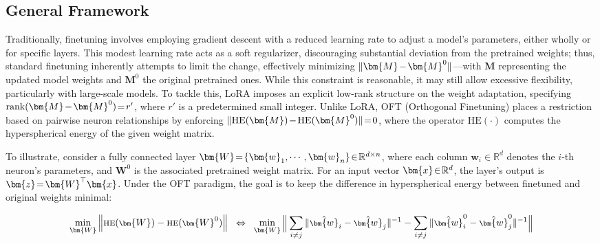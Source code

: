 \subsection{General Framework}

Traditionally, finetuning involves employing gradient descent with a reduced learning rate to adjust a model's parameters, either wholly or for specific layers. This modest learning rate acts as a soft regularizer, discouraging substantial deviation from the pretrained weights; thus, standard finetuning inherently attempts to limit the change, effectively minimizing $\thickmuskip=2mu \medmuskip=2mu \| \bm{M} - \bm{M}^0\|$—with $\bm{M}$ representing the updated model weights and $\bm{M}^0$ the original pretrained ones. While this constraint is reasonable, it may still allow excessive flexibility, particularly with large-scale models. To tackle this, LoRA imposes an explicit low-rank structure on the weight adaptation, specifying $\thickmuskip=2mu \medmuskip=2mu \text{rank}(\bm{M} - \bm{M}^0)=r'$, where $r'$ is a predetermined small integer. Unlike LoRA, OFT (Orthogonal Finetuning) places a restriction based on pairwise neuron relationships by enforcing $\thickmuskip=2mu \medmuskip=2mu \| \text{HE}(\bm{M})-\text{HE}(\bm{M}^0) \|=0$, where the operator $\text{HE}(\cdot)$ computes the hyperspherical energy of the given weight matrix.

To illustrate, consider a fully connected layer $\thickmuskip=2mu \medmuskip=2mu \bm{W}=\{\bm{w}_1,\cdots,\bm{w}_n\}\in\mathbb{R}^{d\times n}$, where each column $\bm{w}_i\in\mathbb{R}^{d}$ denotes the $i$-th neuron's parameters, and $\bm{W}^0$ is the associated pretrained weight matrix. For an input vector $\thickmuskip=2mu \medmuskip=2mu \bm{x}\in\mathbb{R}^d$, the layer's output is $\thickmuskip=2mu \medmuskip=2mu \bm{z}=\bm{W}^\top\bm{x}$. Under the OFT paradigm, the goal is to keep the difference in hyperspherical energy between finetuned and original weights minimal:

\begin{equation}\label{eq:oft_principle}
\footnotesize
\min_{\bm{W}} \left\| \text{HE}(\bm{W})-\text{HE}(\bm{W}^0)\right\|~~\Leftrightarrow~~\min_{\bm{W}} \bigg{\|} \sum_{i\neq j} \|\hat{\bm{w}}_i-\hat{\bm{w}}_j\|^{-1}-\sum_{i\neq j} \|\hat{\bm{w}}^0_i-\hat{\bm{w}}^0_j\|^{-1}\bigg{\|}
\end{equation}

